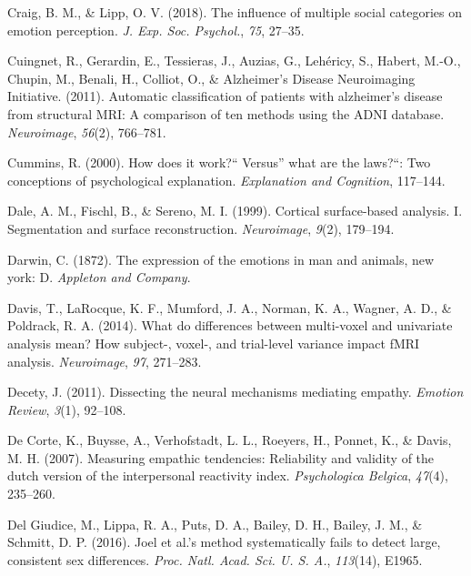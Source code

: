 \documentclass[11pt,american,a4paper,oneside,]{memoir} %
\begin{document}
\leavevmode\hypertarget{ref-Craig2018-jm}{}%
Craig, B. M., \& Lipp, O. V. (2018). The influence of multiple social categories on emotion perception. \emph{J. Exp. Soc. Psychol.}, \emph{75}, 27--35.

\leavevmode\hypertarget{ref-Cuingnet2011-hv}{}%
Cuingnet, R., Gerardin, E., Tessieras, J., Auzias, G., Lehéricy, S., Habert, M.-O., Chupin, M., Benali, H., Colliot, O., \& Alzheimer's Disease Neuroimaging Initiative. (2011). Automatic classification of patients with alzheimer's disease from structural MRI: A comparison of ten methods using the ADNI database. \emph{Neuroimage}, \emph{56}(2), 766--781.

\leavevmode\hypertarget{ref-Cummins2000-pk}{}%
Cummins, R. (2000). How does it work?{}`` Versus'' what are the laws?{}``: Two conceptions of psychological explanation. \emph{Explanation and Cognition}, 117--144.

\leavevmode\hypertarget{ref-Dale1999-rk}{}%
Dale, A. M., Fischl, B., \& Sereno, M. I. (1999). Cortical surface-based analysis. I. Segmentation and surface reconstruction. \emph{Neuroimage}, \emph{9}(2), 179--194.

\leavevmode\hypertarget{ref-Darwin1872-nv}{}%
Darwin, C. (1872). The expression of the emotions in man and animals, new york: D. \emph{Appleton and Company}.

\leavevmode\hypertarget{ref-Davis2014-lw}{}%
Davis, T., LaRocque, K. F., Mumford, J. A., Norman, K. A., Wagner, A. D., \& Poldrack, R. A. (2014). What do differences between multi-voxel and univariate analysis mean? How subject-, voxel-, and trial-level variance impact fMRI analysis. \emph{Neuroimage}, \emph{97}, 271--283.

\leavevmode\hypertarget{ref-decety2011dissecting}{}%
Decety, J. (2011). Dissecting the neural mechanisms mediating empathy. \emph{Emotion Review}, \emph{3}(1), 92--108.

\leavevmode\hypertarget{ref-de2007measuring}{}%
De Corte, K., Buysse, A., Verhofstadt, L. L., Roeyers, H., Ponnet, K., \& Davis, M. H. (2007). Measuring empathic tendencies: Reliability and validity of the dutch version of the interpersonal reactivity index. \emph{Psychologica Belgica}, \emph{47}(4), 235--260.

\leavevmode\hypertarget{ref-Del_Giudice2016-ns}{}%
Del Giudice, M., Lippa, R. A., Puts, D. A., Bailey, D. H., Bailey, J. M., \& Schmitt, D. P. (2016). Joel et al.'s method systematically fails to detect large, consistent sex differences. \emph{Proc. Natl. Acad. Sci. U. S. A.}, \emph{113}(14), E1965.
\end{document}
